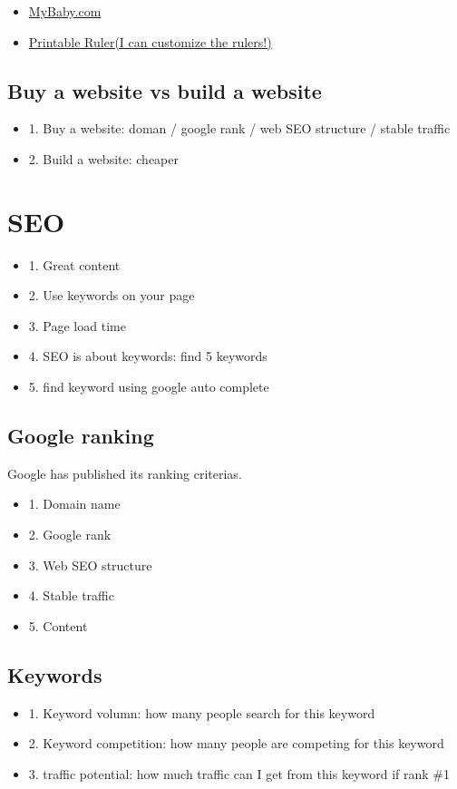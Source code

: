 \documentclass[12pt]{article}
\begin{document}
\begin{itemize}

    \item \href{https://www.mybabyboutique.us/}{MyBaby.com}
    \item \href{https://www.printable-ruler.net/}{Printable Ruler(I can customize the rulers!)}
\end{itemize}

\subsection{Buy a website vs build a website}
\begin{itemize}
    \item 1. Buy a website: doman / google rank / web SEO structure / stable traffic
    \item 2. Build a website: cheaper
\end{itemize}

\section{SEO}

\begin{itemize}
    \item 1. Great content
    \item 2. Use keywords on your page
    \item 3. Page load time
    \item 4. SEO is about keywords: find 5 keywords 
    \item 5. find keyword using google auto complete


\end{itemize}
\subsection{Google ranking}

Google has published its ranking criterias.
\begin{itemize}
    \item 1. Domain name
    \item 2. Google rank
    \item 3. Web SEO structure
    \item 4. Stable traffic
    \item 5. Content
\end{itemize}

\subsection{Keywords}
\begin{itemize}
    \item 1. Keyword volumn: how many people search for this keyword
    \item 2. Keyword competition: how many people are competing for this keyword
    \item 3. traffic potential: how much traffic can I get from this keyword if rank \#1
\end{itemize}
\end{document}
